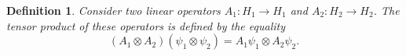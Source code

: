 \documentclass[11pt]{article}
\newtheorem{definition}{Definition}[section]
\begin{document}
\begin{definition}
Consider two linear operators $A_1: H_1\to H_1$ and $A_2: H_2\to H_2$. The tensor product of these operators is defined by the equality
\[
(A_1\otimes A_2)(\psi_1\otimes \psi_2) = A_1\psi_1 \otimes A_2\psi_2.
\]
\end{definition}
\end{document}

